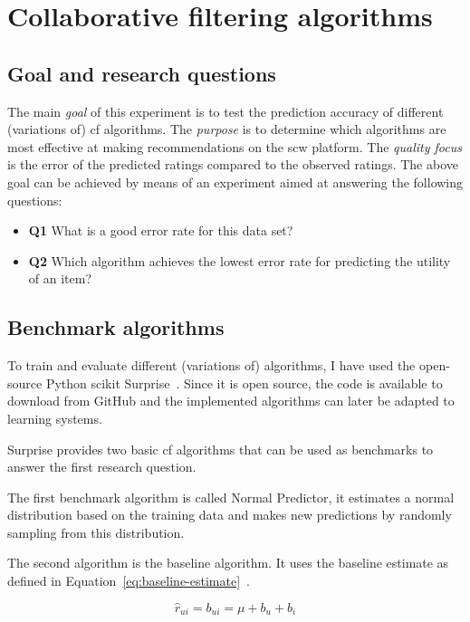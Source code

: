 \section{Collaborative filtering algorithms}
\label{sec:eval-cf}

\subsection{Goal and research questions}
The main \textit{goal} of this experiment is to test the prediction accuracy of different (variations of) \gls{cf} algorithms.
The \textit{purpose} is to determine which algorithms are most effective at making recommendations on the \gls{scw} platform.
The \textit{quality focus} is the error of the predicted ratings compared to the observed ratings.
The above goal can be achieved by means of an experiment aimed at answering the following questions:
\begin{itemize}
    \item \textbf{Q1} What is a good error rate for this data set?
    \item \textbf{Q2} Which algorithm achieves the lowest error rate for predicting the utility of an item?
\end{itemize}

\subsection{Benchmark algorithms}
To train and evaluate different (variations of) algorithms, I have used the open-source Python scikit Surprise~\cite{Hug2020}.
Since it is open source, the code is available to download from GitHub and the implemented algorithms can later be adapted to learning systems.

Surprise provides two basic \gls{cf} algorithms that can be used as benchmarks to answer the first research question.

The first benchmark algorithm is called Normal Predictor, it estimates a normal distribution based on the training data and makes new predictions by randomly sampling from this distribution.

The second algorithm is the baseline algorithm.
It uses the baseline estimate as defined in Equation~\ref{eq:baseline-estimate}~\cite{Koren2010}.

\begin{equation}
    \label{eq:baseline-estimate}
    \hat{r}_{ui} = b_{ui} = \mu + b_u + b_i
\end{equation}

